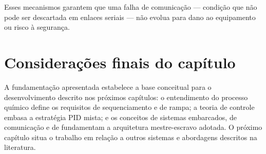 Esses mecanismos garantem que uma falha de comunica\c{c}\~ao --- condi\c{c}\~ao
que n\~ao pode ser descartada em enlaces seriais --- n\~ao evolua para dano ao
equipamento ou risco \`a seguran\c{c}a.

\section{Considera\c{c}\~oes finais do cap\'itulo}

A fundamenta\c{c}\~ao apresentada estabelece a base conceitual para o
desenvolvimento descrito nos pr\'oximos cap\'itulos: o entendimento do processo
qu\'imico define os requisitos de sequenciamento e de rampa; a teoria de controle
embasa a estrat\'egia PID mista; e os conceitos de sistemas embarcados, de
comunica\c{c}\~ao e de \ihm fundamentam a arquitetura mestre-escravo adotada. O
pr\'oximo cap\'itulo situa o trabalho em rela\c{c}\~ao a outros sistemas e
abordagens descritos na literatura.
